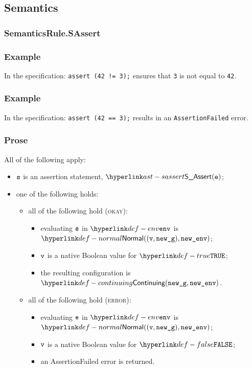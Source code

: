 \subsection{Semantics}
\subsubsection{SemanticsRule.SAssert \label{sec:SemanticsRule.SAssert}}
\subsubsection{Example}
In the specification:
\texttt{assert (42 != 3);} ensures that \texttt{3} is not equal to \texttt{42}.

\subsubsection{Example}
In the specification:
\texttt{assert (42 == 3);} results in an \texttt{AssertionFailed} error.
\subsubsection{Prose}
All of the following apply:
\begin{itemize}
  \item $\texttt{s}$ is an assertion statement, $\SAssert(\ve)$;
  \item one of the following holds:
  \begin{itemize}
    \item all of the following hold (\textsc{okay}):
    \begin{itemize}
      \item evaluating $\texttt{e}$ in $\env$ is $\Normal((\vv, \newg), \newenv)$\ProseOrAbnormal;
      \item $\texttt{v}$ is a native Boolean value for $\True$;
      \item the resulting configuration is $\Continuing(\newg, \newenv)$.
    \end{itemize}

    \item all of the following hold (\textsc{error}):
    \begin{itemize}
      \item evaluating $\texttt{e}$ in $\env$ is $\Normal((\vv, \newg), \newenv)$;
      \item $\texttt{v}$ is a native Boolean value for $\False$;
      \item an AssertionFailed error is returned.
    \end{itemize}
  \end{itemize}
\end{itemize}
